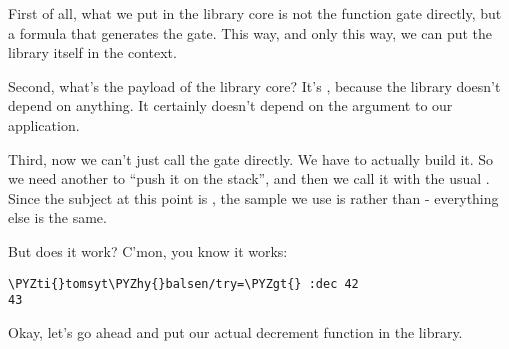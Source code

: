 First of all, what we put in the library core is not the function
gate directly, but a formula that generates the gate.  This way,
and only this way, we can put the library itself in the context.

Second, what's the payload of the library core?  It's ,
because the library doesn't depend on anything.  It certainly
doesn't depend on the argument to our application.

Third, now we can't just call the gate directly.  We have to
actually build it.  So we need another  to ``push it on the
stack'', and then we call it with the usual .  Since the
subject at this point is , the sample we
use is \kode{[0 7]} rather than \kode{[0 3]} - everything else is the same.

But does it work?  C'mon, you know it works:

\begin{framed_shaded}
\begin{Verbatim}[fontsize=\relsize{-2.5},commandchars=\\\{\}]
\PYZti{}tomsyt\PYZhy{}balsen/try=\PYZgt{} :dec 42
43
\end{Verbatim}
\end{framed_shaded}
Okay, let's go ahead and put our actual decrement function in
the library.

